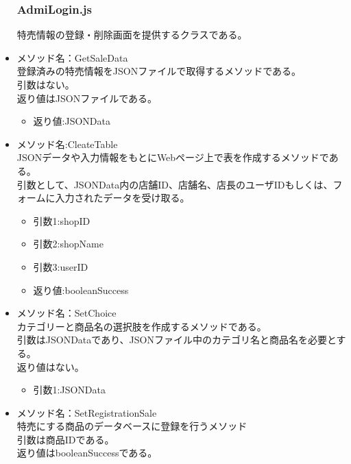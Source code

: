 \documentclass[a4j]{jarticle}
\begin{document}
\begin{itemize}
\subsubsection{AdmiLogin.js}
特売情報の登録・削除画面を提供するクラスである。
\item メソッド名：GetSaleData\\

登録済みの特売情報をJSONファイルで取得するメソッドである。\\
引数はない。\\
返り値はJSONファイルである。
	\begin{itemize}	
		\item 返り値:JSONData
	\end{itemize}


\item メソッド名:CleateTable\\
JSONデータや入力情報をもとにWebページ上で表を作成するメソッドである。\\
引数として、JSONData内の店舗ID、店舗名、店長のユーザIDもしくは、フォームに入力されたデータを受け取る。
	\begin{itemize}	
		\item 引数1:shopID
		\item 引数2:shopName
		\item 引数3:userID
		\item 返り値:booleanSuccess
	\end{itemize}
\item メソッド名：SetChoice\\

カテゴリーと商品名の選択肢を作成するメソッドである。\\
引数はJSONDataであり、JSONファイル中のカテゴリ名と商品名を必要とする。\\
返り値はない。
	\begin{itemize}
		\item 引数1:JSONData
	\end{itemize}
	
\item メソッド名：SetRegistrationSale\\

特売にする商品のデータベースに登録を行うメソッド\\
引数は商品IDである。\\%
返り値はbooleanSuccessである。


\end{itemize}
\end{document}
